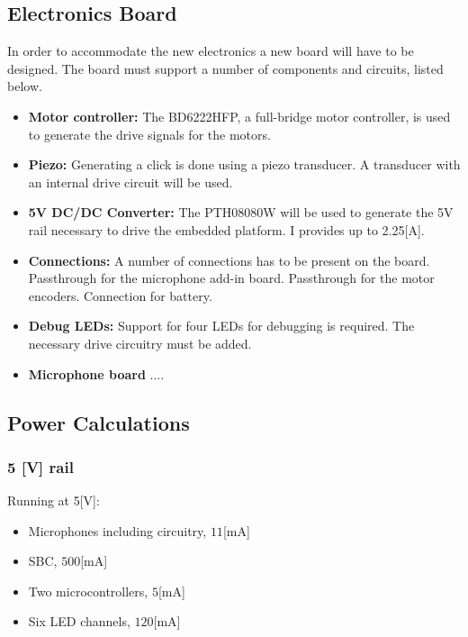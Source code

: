 \subsection{Electronics Board} %
\label{sub:electronics_board}
In order to accommodate the new electronics a new board will have to be designed.
The board must support a number of components and circuits, listed below.
\begin{itemize}
	\item \textbf{Motor controller:} The BD6222HFP, a full-bridge motor controller, is used to generate the drive signals for the motors.
	\item \textbf{Piezo:} Generating a click is done using a piezo transducer.
	A transducer with an internal drive circuit will be used.
	\item \textbf{5V DC/DC Converter:} The PTH08080W will be used to generate the 5V rail necessary to drive the embedded platform. I provides up to 2.25[A].
	\item \textbf{Connections:} A number of connections has to be present on the board.
	Passthrough for the microphone add-in board.
	Passthrough for the motor encoders.
	Connection for battery.
	\item \textbf{Debug LEDs:} Support for four LEDs for debugging is required.
	The necessary drive circuitry must be added.
	\item \textbf{Microphone board} ....
\end{itemize}


\subsection{Power Calculations} %
\label{sub:power_calculations}

\subsubsection{5 [V] rail} %

Running at 5[V]:
\begin{itemize}
	\item Microphones including circuitry, $11$[mA]
	\item SBC, $500$[mA]
	\item Two microcontrollers, $5$[mA]
	\item Six LED channels, $120$[mA]
\end{itemize}

